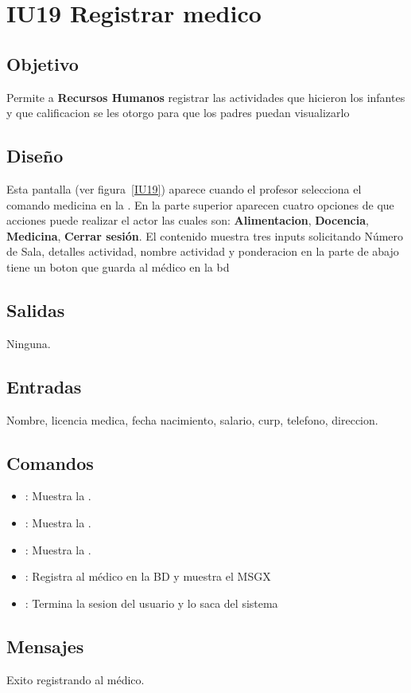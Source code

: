 \newpage
\section{IU19 Registrar medico}

\subsection{Objetivo}
	Permite a {\bf Recursos Humanos} registrar las actividades que hicieron los infantes y que calificacion se les otorgo para que los padres puedan visualizarlo

\subsection{Diseño}
	 Esta pantalla  (ver figura~\ref{IU19}) aparece cuando el            profesor selecciona el comando medicina en la . 
         En la parte superior aparecen cuatro opciones de que acciones puede realizar el actor las cuales son: {\bf Alimentacion}, {\bf Docencia}, {\bf Medicina}, {\bf Cerrar sesión}. 
         El contenido muestra tres inputs solicitando Número de Sala, detalles actividad, nombre actividad y ponderacion
         en la parte de abajo tiene un boton que guarda al médico en la bd
 

\subsection{Salidas}

	Ninguna.

\subsection{Entradas}
Nombre, licencia medica, fecha nacimiento, salario, curp, telefono, direccion.

\subsection{Comandos}
\begin{itemize}
	\item {}: Muestra la .
	\item {}: Muestra la .
 	\item {}: Muestra la .
        \item {}: Registra al médico en la BD y muestra el MSGX
        \item {}: Termina la sesion del usuario y lo saca del sistema
\end{itemize}

\subsection{Mensajes}

\begin{Citemize}
	\item Exito registrando al médico.
\end{Citemize}

